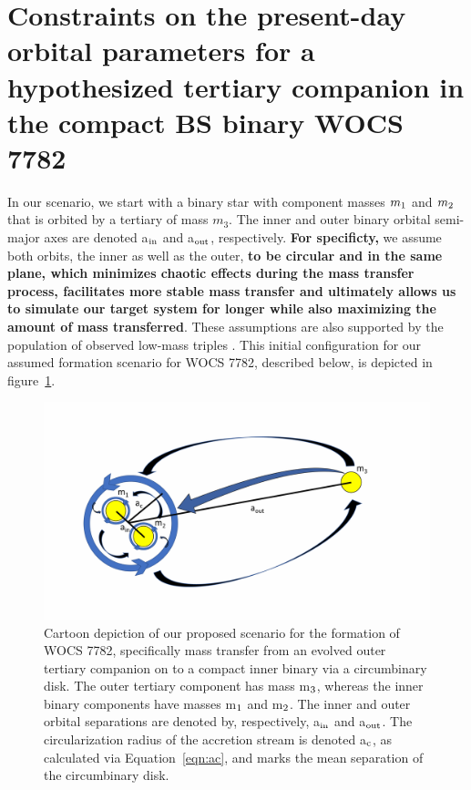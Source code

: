 \documentclass[twocolumn]{aastex62}
\begin{document}
\section{Constraints on the present-day orbital parameters for a hypothesized
         tertiary companion in the compact BS binary WOCS 7782} \label{sect:dyn}

In our scenario, we start with a binary star with component masses
$m_{\rm 1}$ and $m_{\rm 2}$ that is orbited by a tertiary of mass
$m_3$. The inner and outer binary orbital semi-major axes are denoted
a$_{\rm in}$ and a$_{\rm out}$, respectively.  \textbf{For
  specificty,} we assume both orbits, the inner as well as the outer,
\textbf{to be circular and in the same plane, which minimizes chaotic
  effects during the mass transfer process, facilitates more stable
  mass transfer and ultimately allows us to simulate our target system
  for longer while also maximizing the amount of mass transferred}.
These assumptions are also supported by the population of observed
low-mass triples \citep{2010yCat..73890925T,2018ApJ...854...44M}.
This initial configuration for our assumed formation scenario for WOCS
7782, described below, is depicted in figure~\ref{fig:fig1}.

\begin{figure}[ht!]
\includegraphics[width=\columnwidth]{fig_doodle.pdf}
\caption{Cartoon depiction of our proposed scenario for the formation
  of WOCS 7782, specifically mass transfer from an evolved outer
  tertiary companion on to a compact inner binary via a circumbinary
  disk.  The outer tertiary component has mass m$_{\rm 3}$, whereas
  the inner binary components have masses m$_{\rm 1}$ and m$_{\rm 2}$.
  The inner and outer orbital separations are denoted by,
  respectively, a$_{\rm in}$ and a$_{\rm out}$.  The circularization
  radius of the accretion stream is denoted a$_{\rm c}$, as calculated
  via Equation~\ref{eqn:ac}, and marks the mean separation of the
  circumbinary disk.
\label{fig:fig1}}
\end{figure}
\end{document}
